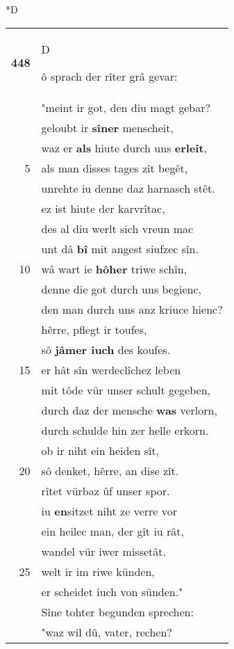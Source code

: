 \documentclass[8pt,a4paper,notitlepage]{article}
\begin{document}
\begin{table}[ht]
\begin{minipage}[t]{0.5\linewidth}
\small
\begin{center}*D
\end{center}
\begin{tabular}{rl}
\textbf{448} & \begin{large}D\end{large}ô sprach der rîter grâ gevar:\\ 
 & "meint ir got, den diu magt gebar?\\ 
 & geloubt ir \textbf{sîner} menscheit,\\ 
 & waz er \textbf{als} hiute durch uns \textbf{erleit},\\ 
5 & als man disses tages zît begêt,\\ 
 & unrehte iu denne daz harnasch stêt.\\ 
 & ez ist hiute der karvrîtac,\\ 
 & des al diu werlt sich vreun mac\\ 
 & unt dâ \textbf{bî} mit angest siufzec sîn.\\ 
10 & wâ wart ie \textbf{hôher} triwe schîn,\\ 
 & denne die got durch uns begienc,\\ 
 & den man durch uns anz kriuce hienc?\\ 
 & hêrre, pflegt ir toufes,\\ 
 & sô \textbf{jâmer iuch} des koufes.\\ 
15 & er hât sîn werdeclîchez leben\\ 
 & mit tôde vür unser schult gegeben,\\ 
 & durch daz der mensche \textbf{was} verlorn,\\ 
 & durch schulde hin zer helle erkorn.\\ 
 & ob ir niht ein heiden sît,\\ 
20 & sô denket, hêrre, an dise zît.\\ 
 & rîtet vürbaz ûf unser spor.\\ 
 & iu \textbf{en}sitzet niht ze verre vor\\ 
 & ein heilec man, der gît iu rât,\\ 
 & wandel vür iwer missetât.\\ 
25 & welt ir im riwe künden,\\ 
 & er scheidet iuch von sünden."\\ 
 & Sîne tohter begunden sprechen:\\ 
 & "waz wil dû, vater, rechen?\\ 

\end{tabular}
\end{minipage}
\end{table}
\end{document}
